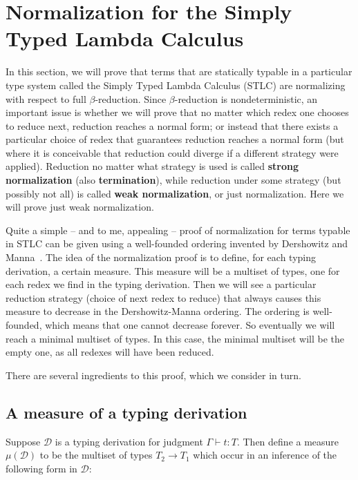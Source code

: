 \documentclass{article}
\begin{document}
\section{Normalization for the Simply Typed Lambda Calculus}

In this section, we will prove that terms that are statically typable
in a particular type system called the Simply Typed Lambda Calculus
(STLC) are normalizing with respect to full $\beta$-reduction.  Since
$\beta$-reduction is nondeterministic, an important issue is whether
we will prove that no matter which redex one chooses to reduce next,
reduction reaches a normal form; or instead that there exists a
particular choice of redex that guarantees reduction reaches a normal
form (but where it is conceivable that reduction could diverge if a
different strategy were applied).  Reduction no matter what strategy
is used is called \textbf{strong normalization} (also
\textbf{termination}), while reduction under some strategy (but
possibly not all) is called \textbf{weak normalization}, or just
normalization.  Here we will prove just weak normalization.

Quite a simple -- and to me, appealing -- proof of normalization for
terms typable in STLC can be given using a well-founded ordering
invented by Dershowitz and Manna~\cite{dm79}.  The idea of the
normalization proof is to define, for each typing derivation, a
certain measure.  This measure will be a multiset of types, one for
each redex we find in the typing derivation.  Then we will see a
particular reduction strategy (choice of next redex to reduce) that
always causes this measure to decrease in the Dershowitz-Manna
ordering.  The ordering is well-founded, which means that one cannot
decrease forever.  So eventually we will reach a minimal multiset of
types.  In this case, the minimal multiset will be the empty one, as
all redexes will have been reduced.

There are several ingredients to this proof, which we consider in turn.

\subsection{A measure of a typing derivation}

Suppose $\mathcal{D}$ is a typing derivation for judgment $\Gamma\vdash t : T$.  Then
define a measure $\mu(\mathcal{D})$ to be the multiset of types $T_2 \to T_1$ which occur in an
inference of the following form in $\mathcal{D}$:
\end{document}
